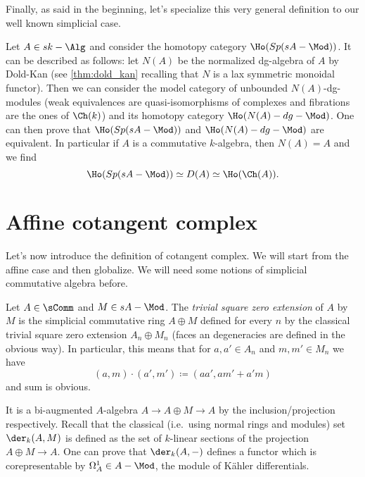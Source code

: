         Finally, as said in the beginning, let's specialize this very general definition to our well known simplicial case.
        \begin{remark}
            \label{remark:description_simplicial_stable_modules}
            Let $A \in sk-\Alg$ and consider the homotopy category $\Ho(Sp(sA-\Mod))$. It can be described as follows: let $N(A)$ be the normalized dg-algebra of $A$ by Dold-Kan (see \cref{thm:dold_kan} recalling that $N$ is a lax symmetric monoidal functor). Then we can consider the model category of unbounded $N(A)$-dg-modules (weak equivalences are quasi-isomorphisms of complexes and fibrations are the ones of $\Ch(k)$) and its homotopy category $\Ho(N(A)-dg-\Mod)$. One can then prove that $\Ho(Sp(sA-\Mod))$ and $\Ho(N(A)-dg-\Mod)$ are equivalent. In particular if $A$ is a commutative $k$-algebra, then $N(A) = A$ and we find \[\Ho(Sp(sA-\Mod)) \simeq D(A) \simeq \Ho(\Ch(A)). \]
        \end{remark} 
    \section{Affine cotangent complex}
        Let's now introduce the definition of cotangent complex. We will start from the affine case and then globalize. We will need some notions of simplicial commutative algebra before. 
        \begin{defn}
            \label{defn:trivial_square_zero_extension}
            Let $A \in \sComm$ and $M \in sA-\Mod$. The \emph{trivial square zero extension} of $A$ by $M$ is the simplicial commutative ring $A \oplus M$ defined for every $n$ by the classical trivial square zero extension $A_n \oplus M_n$ (faces an degeneracies are defined in the obvious way). In particular, this means that for $a, a' \in A_n$ and $m, m' \in M_n$ we have \[(a, m) \cdot (a', m') \coloneqq (aa', am' + a'm) \] and sum is obvious.
        \end{defn}
        It is a bi-augmented $A$-algebra $A \to A \oplus M \to A$ by the inclusion/projection respectively. 
        Recall that the classical (i.e.\ using normal rings and modules) set $\der_k(A, M)$ is defined as the set of $k$-linear sections of the projection $A \oplus M \to A$. One can prove that $\der_k(A, -)$ defines a functor which is corepresentable by $\Omega^1_A \in A-\Mod$, the module of K{\"a}hler differentials.

